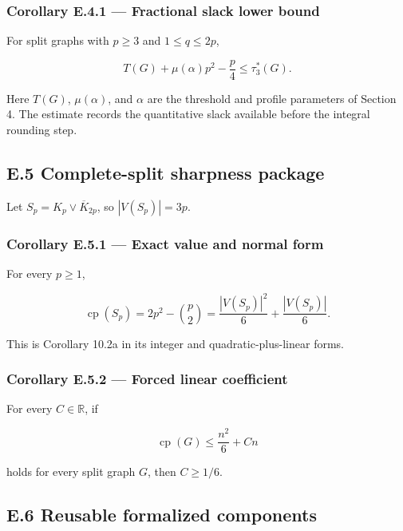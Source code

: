 \documentclass[english,11pt,a4paper]{article}
\begin{document}
\subsubsection{Corollary E.4.1 --- Fractional slack lower
bound}\label{corollary-e.4.1-fractional-slack-lower-bound}

For split graphs with \(p\ge3\) and \(1\le q\le2p\),

\[
T(G)+\mu(\alpha)p^2-\frac p4
\le
\tau_3^*(G).
\]

Here \(T(G)\), \(\mu(\alpha)\), and \(\alpha\) are the threshold and
profile parameters of Section 4. The estimate records the quantitative
slack available before the integral rounding step.

\subsection{E.5 Complete-split sharpness
package}\label{e.5-complete-split-sharpness-package}

Let \(S_p=K_p\vee\overline K_{2p}\), so \(|V(S_p)|=3p\).

\subsubsection{Corollary E.5.1 --- Exact value and normal
form}\label{corollary-e.5.1-exact-value-and-normal-form}

For every \(p\ge1\),

\[
\operatorname{cp}(S_p)
=2p^2-\binom p2
=\frac{|V(S_p)|^2}{6}+\frac{|V(S_p)|}{6}.
\]

This is Corollary 10.2a in its integer and quadratic-plus-linear forms.

\subsubsection{Corollary E.5.2 --- Forced linear
coefficient}\label{corollary-e.5.2-forced-linear-coefficient}

For every \(C\in\mathbb R\), if

\[
\operatorname{cp}(G)\le \frac{n^2}{6}+Cn
\]

holds for every split graph \(G\), then \(C\ge1/6\).

\subsection{E.6 Reusable formalized
components}\label{e.6-reusable-formalized-components}
\end{document}
